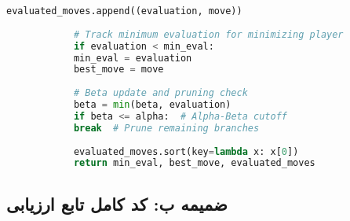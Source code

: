\documentclass[12pt]{article}
\newenvironment{ltrcode}{\lr\bgroup}{\egroup}
\begin{document}
\begin{ltrcode}
\begin{lstlisting}[language=Python, caption=Complete Enhanced Minimax with Alpha-Beta Pruning]
			evaluated_moves.append((evaluation, move))
			
			# Track minimum evaluation for minimizing player
			if evaluation < min_eval:
			min_eval = evaluation
			best_move = move
			
			# Beta update and pruning check
			beta = min(beta, evaluation)
			if beta <= alpha:  # Alpha-Beta cutoff
			break  # Prune remaining branches
			
			evaluated_moves.sort(key=lambda x: x[0])
			return min_eval, best_move, evaluated_moves
		\end{lstlisting}
	\end{ltrcode}
	
	\subsection{ضمیمه ب: کد کامل تابع ارزیابی}
	
\end{document}
